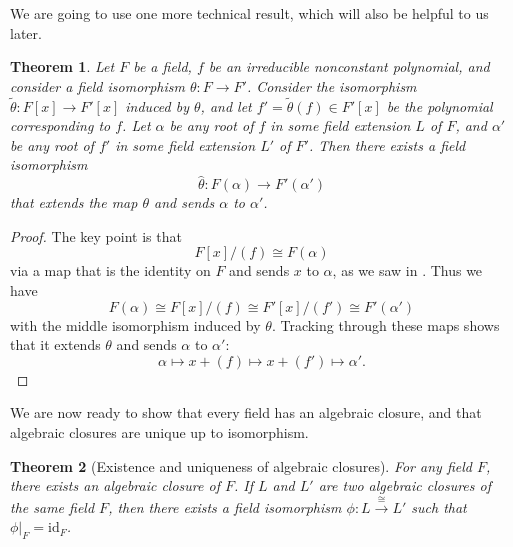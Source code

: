 \documentclass[12pt]{report}
\newtheorem{theorem}{Theorem}[chapter]
\numberwithin{equation}{section}
\numberwithin{theorem}{chapter}
\theoremstyle{definition}
\newtheorem*{basic properties}{Basic Properties}
\newtheorem*{Important Remark}{Important Remark}
\begin{document}
We are going to use one more technical result, which will also be helpful to us later.


\begin{theorem}\label{extending identity on F to iso}
Let $F$ be a field, $f$ be an irreducible nonconstant polynomial, and consider a field isomorphism $\theta\!: F \to F'$. Consider the isomorphism $\tilde\theta\!:F[x] \to F'[x]$ induced by $\theta$, and let $f'=\tilde\theta(f) \in F'[x]$ be the polynomial corresponding to $f$. 
Let $\alpha$ be any root of $f$ in some field extension $L$ of $F$, and $\alpha'$ be any root of $f'$ in some
  field extension $L'$ of $F'$. Then there exists a field isomorphism
$$\widehat{\theta}: F(\alpha) \to F'(\alpha')$$
that extends the map $\theta$ and sends $\alpha$ to $\alpha'$.
\end{theorem}

\begin{proof}
The key point is that
$$F[x]/(f) \cong F(\alpha)$$
via a map that is the identity on $F$ and sends $x$ to $\alpha$, as we
saw in . Thus we have
$$F(\alpha) \cong F[x]/(f) \cong F'[x]/(f') \cong F'(\alpha')$$
with the middle isomorphism induced by $\theta$. Tracking through these
maps shows that it extends $\theta$ and sends $\alpha$ to $\alpha'$:
$$\alpha \mapsto x + (f) \mapsto x + (f') \mapsto \alpha'.$$
\end{proof}



We are now ready to show that every field has an algebraic closure, and that algebraic closures are unique up to isomorphism. 

\begin{theorem}[Existence and uniqueness of algebraic closures]\label{existence and uniqueness of algebraic closures}
For any field $F$, there exists an algebraic closure of $F$. If $L$ and $L'$ are two algebraic closures of the same field $F$, then there exists a field isomorphism $\phi: L \xrightarrow{\cong} L'$ such that $\phi|_F = \mathrm{id}_F$.
\end{theorem}

\end{document}

